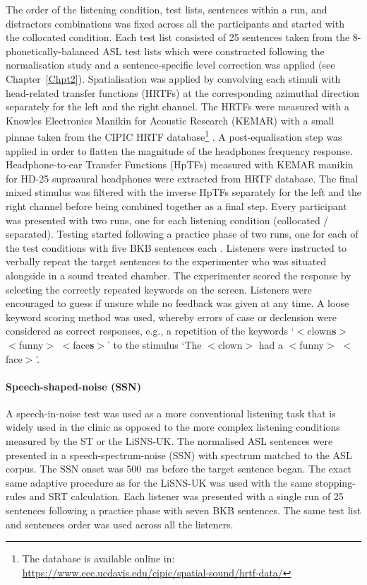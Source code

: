 \documentclass[a4paper, twoside]{templates/ociamthesis}
\begin{document}
The order of the listening condition, test lists, sentences within a run, and distractors combinations was fixed across all the participants and started with the collocated condition. Each test list consisted of 25 sentences taken from the 8-phonetically-balanced ASL test lists which were constructed following the normalisation study and a sentence-specific level correction was applied (see Chapter~\ref{Chpt2}). Spatialisation was applied by convolving each stimuli with head-related transfer functions (HRTFs) at the corresponding azimuthal direction separately for the left and the right channel. The HRTFs were measured with a Knowles Electronics Manikin for Acoustic Research (KEMAR) with a small pinnae taken from the CIPIC HRTF database\footnote{The database is available online in: \url{https://www.ece.ucdavis.edu/cipic/spatial-sound/hrtf-data/}} \autocite[see][``special'' HRTF data]{Algazi2001}. A post-equalisation step was applied in order to flatten the magnitude of the headphones frequency response. Headphone-to-ear Transfer Functions (HpTFs) measured with KEMAR manikin for HD-25 supraaural headphones were extracted from \textcite{Wierstorf2011} HRTF database. The final mixed stimulus was filtered with the inverse HpTFs separately for the left and the right channel before being combined together as a final step. Every participant was presented with two runs, one for each listening condition (collocated / separated). Testing started following a practice phase of two runs, one for each of the test conditions with five BKB sentences each \autocite{Bench1979}. Listeners were instructed to verbally repeat the target sentences to the experimenter who was situated alongside in a sound treated chamber. The experimenter scored the response by selecting the correctly repeated keywords on the screen. Listeners were encouraged to guess if unsure while no feedback was given at any time. A loose keyword scoring method was used, whereby errors of case or declension were considered as correct responses, e.g., a repetition of the keywords `\(<\)clown\textbf{s}\(>\) \(<\)funny\(>\) \(<\)face\textbf{s}\(>\)' to the stimulus `The \(<\)clown\(>\) had a \(<\)funny\(>\) \(<\)face\(>\)'.

\hypertarget{speech-shaped-noise-ssn}{%
\paragraph{Speech-shaped-noise (SSN)}\label{speech-shaped-noise-ssn}}

\hfill\break
A speech-in-noise test was used as a more conventional listening task that is widely used in the clinic as opposed to the more complex listening conditions measured by the ST or the LiSNS-UK. The normalised ASL sentences were presented in a speech-spectrum-noise (SSN) with spectrum matched to the ASL corpus. The SSN onset was 500~ms before the target sentence began. The exact same adaptive procedure as for the LiSNS-UK was used with the same stopping-rules and SRT calculation. Each listener was presented with a single run of 25 sentences following a practice phase with seven BKB sentences. The same test list and sentences order was used across all the listeners.
\end{document}
